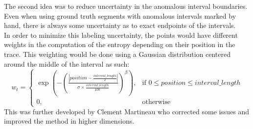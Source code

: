 \documentclass[oneside, a4paper, onecolumn, 11pt]{article}
\begin{document}
The second idea was to reduce uncertainty in the anomalous interval boundaries. Even when using ground truth segments with anomalous intervals marked by hand, there is always some uncertainty as to exact endpoints of the intervals. \\
In order to minimize this labeling uncertainty, the points would have different weights in the computation of the entropy depending on their position in the trace. This weighting would be done using a Gaussian distribution centered around the middle of the interval as such:
\[
w_t =
\begin{cases}
\exp \left( - \left( \frac{| position - \frac{interval\_length}{2} |}{\sigma \times \frac{interval\_length}{100}} \right)^{\beta} \right), & \text{if } 0 \leq position \leq interval\_length \\
0, & \text{otherwise}
\end{cases}
\]
This was further developed by Clement Martineau who corrected some issues and improved the method in higher dimensions.\\
\end{document}
